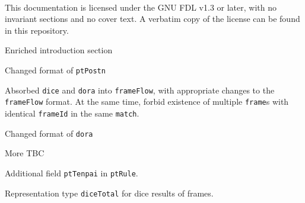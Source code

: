 \documentclass[%
	a4paper%
	,10pt%
	,twoside%
	,notitlepage%
]{article}%
\newcommand*{\github}[1]{\texorpdfstring{\href{https://github.com/#1}{\texttt{#1}}}{#1}}%
\begin{document}
	\paragraph*{}This documentation is licensed under the GNU FDL v1.3 or later, with no invariant sections and no cover text. A verbatim copy of the license can be found in this repository. %
\begin{changelog}[%
	section=true%
	,sectioncmd={\section}%
	,title={Changelog}%
	,label={sec:changelog}%
]%
% 
	\begin{version}[%
		version=\currentVer{}%
		,author={\github{ChemistMikeLam}}%
		,date=\releaseDate{}%
	]%
		\changed{}%
			\item{}Enriched introduction section%
			\item{}Changed format of \lstinline/ptPostn/%
			\item{}Absorbed \lstinline/dice/ and \lstinline/dora/ into \lstinline/frameFlow/, with appropriate changes to the \lstinline/frameFlow/ format. At the same time, forbid existence of multiple \lstinline/frame/s with identical \lstinline/frameId/ in the same \lstinline/match/. %
			\item{}Changed format of \lstinline/dora/%
			\item{}More TBC%
	\end{version}%
	\begin{version}[%
		version=1.0.0-β%
		,author={\github{ChemistMikeLam}}%
		,date=Unreleased%
	]%
		\added{}%
			\item{}Additional field \lstinline/ptTenpai/ in \lstinline/ptRule/. %
			\item{}Representation type \lstinline/diceTotal/ for dice results of frames. %

\end{version}
\end{changelog}
\end{document}
